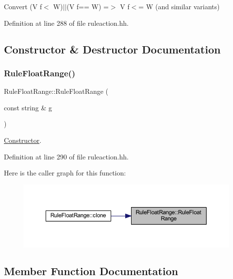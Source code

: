 Convert {\ttfamily (V f$<$ W)$\vert$$\vert$(V f== W) =$>$ V f$<$= W} (and similar variants) 

Definition at line 288 of file ruleaction.\+hh.



\subsection{Constructor \& Destructor Documentation}
\mbox{\label{class_rule_float_range_aa69970a8fae3c4a77dca595f4b14765c}} 
\subsubsection{\texorpdfstring{RuleFloatRange()}{RuleFloatRange()}}
{\footnotesize\ttfamily Rule\+Float\+Range\+::\+Rule\+Float\+Range (\begin{DoxyParamCaption}\item[{const string \&}]{g }\end{DoxyParamCaption})\hspace{0.3cm}{\ttfamily [inline]}}



\mbox{\hyperlink{class_constructor}{Constructor}}. 



Definition at line 290 of file ruleaction.\+hh.

Here is the caller graph for this function\+:
\nopagebreak
\begin{figure}[H]
\begin{center}
\leavevmode
\includegraphics[width=350pt]{class_rule_float_range_aa69970a8fae3c4a77dca595f4b14765c_icgraph}
\end{center}
\end{figure}


\subsection{Member Function Documentation}
\mbox{\label{class_rule_float_range_a39c5067872e30f4d32dc229c53504cef}} 
